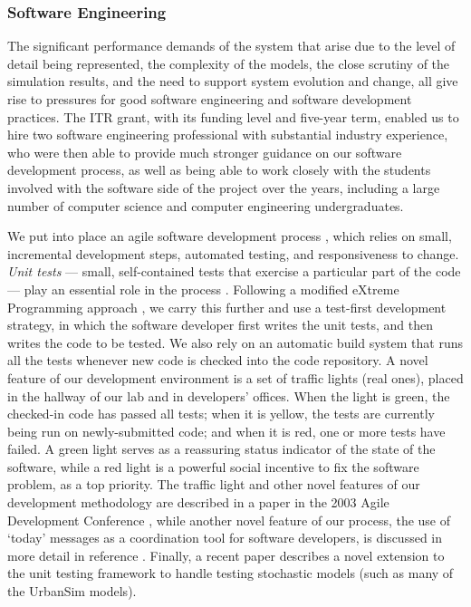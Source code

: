 
\subsubsection{Software Engineering}

The significant performance demands of the system that arise due to the
level of detail being represented, the complexity of
the models, the close scrutiny of the simulation results, and the need to
support system evolution and change, all give rise to pressures for good
software engineering and software development practices.  The ITR grant,
with its funding level and five-year term, enabled us to hire two software
engineering professional with substantial industry experience, who were
then able to provide much stronger guidance on our software development
process, as well as being able to work closely with the students involved
with the software side of the project over the years, including a large
number of computer science and computer engineering undergraduates.

We put into place an agile software development process
\cite{beck-book-2000}, which relies on small, incremental development steps,
automated testing, and responsiveness to change.  \emph{Unit tests} ---
small, self-contained tests that exercise a particular part of the code ---
play an essential role in the process
\cite{hunt-book-2003,noonan-sigcse-2002}.  Following a
modified eXtreme Programming approach \cite{beck-book-2003}, we carry this
further and use a test-first development strategy, in which the software
developer first writes the unit tests, and then writes the code to be
tested.  We also rely on an automatic build system that runs all the tests
whenever new code is checked into the code repository.  A novel feature of
our development environment is a set of traffic lights (real ones), placed
in the hallway of our lab and in developers' offices.  When the light is
green, the checked-in code has passed all tests; when it is yellow, the
tests are currently being run on newly-submitted code; and when it is red,
one or more tests have failed.  A green light serves as a reassuring status
indicator of the state of the software, while a red light is a powerful
social incentive to fix the software problem, as a top priority.  The
traffic light and other novel features of our development methodology are
described in a paper in the 2003 Agile Development Conference
\cite{freeman-benson-agile-2003}, while another novel feature of our
process, the use of `today' messages as a coordination tool for software
developers, is discussed in more detail in reference
\cite{brush-hicss-2005}.  Finally, a recent paper
\cite{sevcikova-issta-2006} describes a novel extension to the unit testing
framework to handle testing stochastic models (such as many of the UrbanSim
models).


